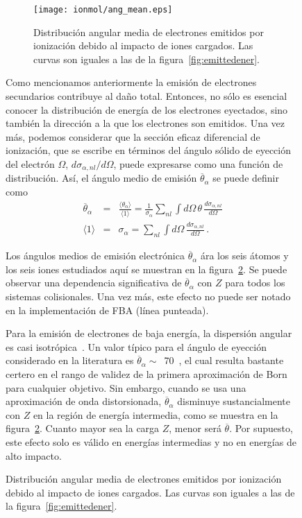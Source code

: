 \begin{figure}
\begin{figure}
\centering
\texttt{[image: ionmol/ang\_mean.eps]}
\caption[Distribución angular media de electrones emitidos.]
{Distribución angular media de electrones emitidos por ionización debido
al impacto de iones cargados. Las curvas son iguales a las de la 
figura~\ref{fig:emittedener}.}
\label{fig:emittedang}
\end{figure} 

Como mencionamos anteriormente la emisión de electrones secundarios
contribuye al daño total. Entonces, no sólo es esencial conocer la 
distribución de energía de los electrones eyectados, sino también la 
dirección a la que los electrones son emitidos. Una vez más, podemos
considerar que la sección eficaz diferencial de ionización, que se 
escribe en términos del ángulo sólido de eyección del electrón $\Omega$, 
$d\sigma_{\alpha,nl}/d\Omega$, puede expresarse como una función de 
distribución. Así, el ángulo medio de emisión $\overline{\theta}_{\alpha}$ 
se puede definir como
\begin{eqnarray}
\overline{\theta}_{\alpha}&=&\frac{\langle\theta_{\alpha}\rangle}
{\langle 1\rangle}=\frac{1}{\sigma_{\alpha}}\sum\limits_{nl}
\int d\Omega\,\theta\,\frac{d\sigma_{\alpha,nl}}{d\Omega} \\
\langle 1\rangle &=&\sigma_{\alpha}=\sum\limits_{nl}\int d\Omega\,
\frac{d\sigma_{\alpha,nl}}{d\Omega}\,.
\end{eqnarray}

Los ángulos medios de emisión electrónica $\overline{\theta}_{\alpha}$ 
ára los seis átomos y los seis iones estudiados aquí se muestran en la 
figura~\ref{fig:emittedang}. Se puede observar una dependencia 
significativa de $\overline{\theta}_{\alpha}$ con $Z$ para todos los 
sistemas colisionales. Una vez más, este efecto no puede ser notado en 
la implementación de FBA (línea punteada).

Para la emisión de electrones de baja energía, la dispersión angular 
es casi isotrópica~\cite{Rudd1992}. Un valor típico para el ángulo de 
eyección considerado en la literatura es 
$\overline{\theta}_{\alpha}\sim$~70\textdegree~\cite{surdutovic2018}, el cual
resulta bastante certero en el rango de validez de la primera 
aproximación de Born para cualquier objetivo. Sin embargo, cuando se 
usa una aproximación de onda distorsionada, $\overline{\theta}_{\alpha}$
disminuye sustancialmente con $Z$ en la región de energía intermedia, 
como se muestra en la figura~\ref{fig:emittedang}. Cuanto mayor sea la 
carga $Z$, menor será $\overline{\theta}$. Por supuesto, este efecto 
solo es válido en energías intermedias y no en energías de alto impacto.


\end{figure}
